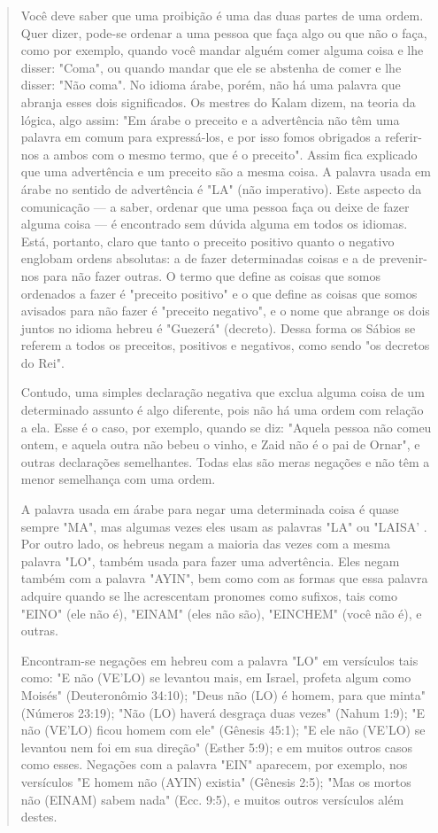 \begin{quote}
Você deve saber que uma proibição é uma das duas partes de uma ordem.
Quer dizer, pode-se ordenar a uma pessoa que faça algo ou que não o
faça, como por exemplo, quando você mandar alguém comer alguma coisa e
lhe disser: "Coma", ou quando mandar que ele se abstenha de comer e lhe
disser: "Não coma". No idioma árabe, porém, não há uma palavra que
abranja esses dois significados. Os mestres do Kalam dizem, na teoria da
lógica, algo assim: "Em árabe o preceito e a advertência não têm uma
palavra em comum para expressá-los, e por isso fomos obrigados a
referir-nos a ambos com o mes­mo termo, que é o preceito". Assim fica
explicado que uma advertência e um preceito são a mesma coisa. A palavra
usada em árabe no sentido de advertên­cia é "LA" (não imperativo). Este
aspecto da comunicação --- a saber, ordenar que uma pessoa faça ou deixe
de fazer alguma coisa --- é encontrado sem dúvi­da alguma em todos os
idiomas. Está, portanto, claro que tanto o preceito posi­tivo quanto o
negativo englobam ordens absolutas: a de fazer determinadas coi­sas e a
de prevenir-nos para não fazer outras. O termo que define as coisas que
somos ordenados a fazer é "preceito positivo" e o que define as coisas
que so­mos avisados para não fazer é "preceito negativo", e o nome que
abrange os dois juntos no idioma hebreu é "Guezerá" (decreto). Dessa
forma os Sábios se referem a todos os preceitos, positivos e negativos,
como sendo "os decre­tos do Rei".

Contudo, uma simples declaração negativa que exclua alguma coisa de um
determinado assunto é algo diferente, pois não há uma ordem com rela­ção
a ela. Esse é o caso, por exemplo, quando se diz: "Aquela pessoa não
co­meu ontem, e aquela outra não bebeu o vinho, e Zaid não é o pai de
Ornar", e outras declarações semelhantes. Todas elas são meras negações
e não têm a menor semelhança com uma ordem.

A palavra usada em árabe para negar uma determinada coisa é quase sempre
"MA", mas algumas vezes eles usam as palavras "LA" ou "LAISA' . Por
outro lado, os hebreus negam a maioria das vezes com a mesma palavra
"LO", também usada para fazer uma advertência. Eles negam também com a
palavra "AYIN", bem como com as formas que essa palavra adquire quando
se lhe acres­centam pronomes como sufixos, tais como "EINO" (ele não é),
"EINAM" (eles não são), "EINCHEM" (você não é), e outras.

Encontram-se negações em hebreu com a palavra "LO" em versícu­los tais
como: "E não (VE'LO) se levantou mais, em Israel, profeta algum como
Moisés" (Deuteronômio 34:10); "Deus não (LO) é homem, para que minta"
(Nú­meros 23:19); "Não (LO) haverá desgraça duas vezes" (Nahum 1:9); "E
não (VE'LO) ficou homem com ele" (Gênesis 45:1); "E ele não (VE'LO) se
levantou nem foi em sua direção" (Esther 5:9); e em muitos outros casos
como esses. Negações com a palavra "EIN" aparecem, por exemplo, nos
versículos "E homem 
não (AYIN) existia" (Gênesis 2:5); "Mas os mortos não (EINAM) sabem
nada" (Ecc. 9:5), e muitos outros versículos além destes.


\end{quote}
